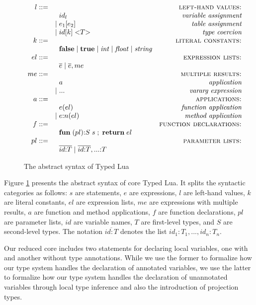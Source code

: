 \begin{figure}[!ht]
$$\begin{array}{rlr}
l ::= & & \textsc{left-hand values:}\\
& \;\; id_{l} & \textit{variable assignment}\\
& | \; e_{1}[e_{2}] & \textit{table assignment}\\
& | \; id[k] \; {<}T{>} & \textit{type coercion}\\
k ::= & & \textsc{literal constants:}\\
& \;\; \mathbf{false} \; | \;
\mathbf{true} \; | \;
{\it int} \; | \;
{\it float} \; | \;
{\it string} & \\
el ::= & & \textsc{expression lists:}\\
& \;\; \overline{e} \; | \;
\overline{e}, me & \\
me ::= & & \textsc{multiple results:}\\
& \;\; a & \textit{application}\\
& | \; {...} & \textit{vararg expression}\\
a ::= & & \textsc{applications:}\\
& \;\; e(el) & \textit{function application}\\
& | \; e{:}n(el) & \textit{method application}\\
f ::= & & \textsc{function declarations:}\\
& \;\; \mathbf{fun} \; (pl){:}S \; s \;;\; \mathbf{return} \; el & \\
pl ::= & & \textsc{parameter lists:}\\
& \;\; \overline{id{:}T} \; | \;
\overline{id{:}T},{...}{:}T & \\
\end{array}
$$
\dend
\caption{The abstract syntax of Typed Lua}
\label{fig:syntax}
\end{figure}

Figure \ref{fig:syntax} presents the abstract syntax of core Typed Lua.
It splits the syntactic categories as follows:
$s$ are statements, $e$ are expressions, $l$ are left-hand values,
$k$ are literal constants, $el$ are expression lists,
$me$ are expressions with multiple results, $a$ are function and method applications,
$f$ are function declarations, $pl$ are parameter lists,
$id$ are variable names, $T$ are first-level types, and $S$ are second-level types.
The notation $\overline{id{:}T}$ denotes the list $id_{1}{:}T_{1}, ..., id_{n}{:}T_{n}$.

Our reduced core includes two statements for declaring local variables,
one with and another without type annotations.
While we use the former to formalize how our type system handles the declaration
of annotated variables, we use the latter to formalize how our type system
handles the declaration of unannotated variables through local type inference
and also the introduction of projection types.

